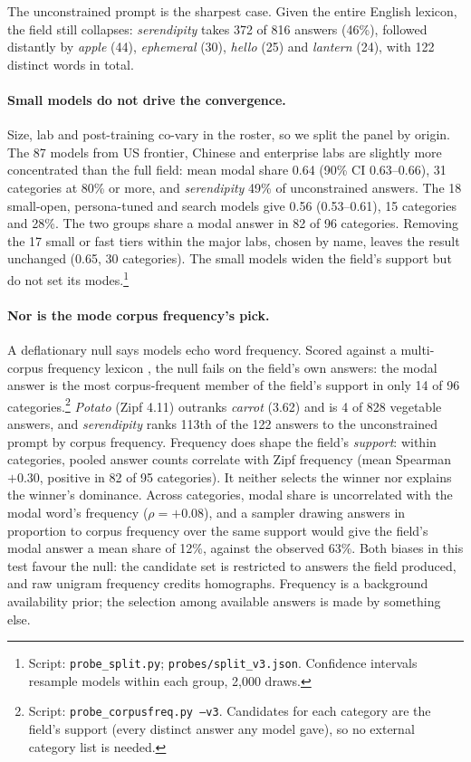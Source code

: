 \documentclass[11pt]{article}
\begin{document}
The unconstrained prompt is the sharpest case. Given the entire English lexicon, the field still collapses: \emph{serendipity} takes 372 of 816 answers (46\%), followed distantly by \emph{apple} (44), \emph{ephemeral} (30), \emph{hello} (25) and \emph{lantern} (24), with 122 distinct words in total.

\paragraph{Small models do not drive the convergence.}
Size, lab and post-training co-vary in the roster, so we split the panel by origin. The 87 models from US frontier, Chinese and enterprise labs are slightly more concentrated than the full field: mean modal share 0.64 (90\% CI 0.63--0.66), 31 categories at 80\% or more, and \emph{serendipity} 49\% of unconstrained answers. The 18 small-open, persona-tuned and search models give 0.56 (0.53--0.61), 15 categories and 28\%. The two groups share a modal answer in 82 of 96 categories. Removing the 17 small or fast tiers within the major labs, chosen by name, leaves the result unchanged (0.65, 30 categories). The small models widen the field's support but do not set its modes.\footnote{Script: \texttt{probe\_split.py}; \texttt{probes/split\_v3.json}. Confidence intervals resample models within each group, 2{,}000 draws.}

\paragraph{Nor is the mode corpus frequency's pick.}
A deflationary null says models echo word frequency. Scored against a multi-corpus frequency lexicon \citep{speer2022wordfreq}, the null fails on the field's own answers: the modal answer is the most corpus-frequent member of the field's support in only 14 of 96 categories.\footnote{Script: \texttt{probe\_corpusfreq.py --v3}. Candidates for each category are the field's support (every distinct answer any model gave), so no external category list is needed.} \emph{Potato} (Zipf 4.11) outranks \emph{carrot} (3.62) and is 4 of 828 vegetable answers, and \emph{serendipity} ranks 113th of the 122 answers to the unconstrained prompt by corpus frequency. Frequency does shape the field's \emph{support}: within categories, pooled answer counts correlate with Zipf frequency (mean Spearman $+0.30$, positive in 82 of 95 categories). It neither selects the winner nor explains the winner's dominance. Across categories, modal share is uncorrelated with the modal word's frequency ($\rho = +0.08$), and a sampler drawing answers in proportion to corpus frequency over the same support would give the field's modal answer a mean share of 12\%, against the observed 63\%. Both biases in this test favour the null: the candidate set is restricted to answers the field produced, and raw unigram frequency credits homographs. Frequency is a background availability prior; the selection among available answers is made by something else.
\end{document}

